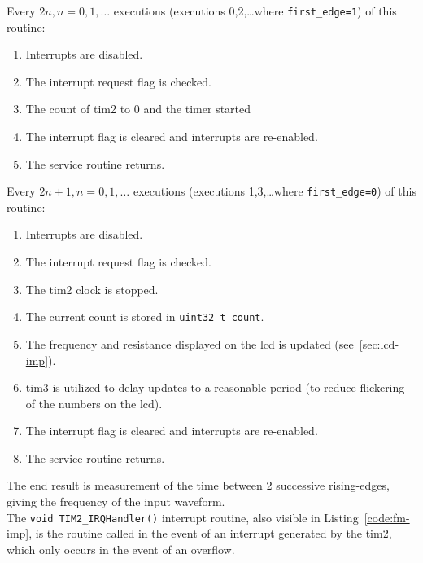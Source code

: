 
Every $2n,
n=0,1,\dots$  executions (executions 0,2,\dots where
\lstinline{first_edge=1}) of this routine:

\begin{enumerate}
	\item Interrupts are disabled.
	\item The interrupt request flag is checked.
	\item The count of \gls{tim2} to 0 and the timer started
	\item The interrupt flag is cleared and interrupts are re-enabled.
	\item The service routine returns.
\end{enumerate}

Every $2n+1, n=0,1,\dots$ executions (executions 1,3,\dots where
\lstinline{first_edge=0}) of this routine:

\begin{enumerate}
	\item Interrupts are disabled.
	\item The interrupt request flag is checked.
	\item The \gls{tim2} clock is stopped.
	\item The current count is stored in \lstinline{uint32_t count}.
	\item The frequency and resistance displayed on the \gls{lcd} is
		updated (see~\ref{sec:lcd-imp}).
	\item \gls{tim3} is utilized to delay updates to a reasonable period
		(to reduce flickering of the numbers on the \gls{lcd}).
	\item The interrupt flag is cleared and interrupts are re-enabled.
	\item The service routine returns.
\end{enumerate}

The end result is measurement of the time between 2 successive
rising-edges, giving the frequency of the input waveform. \\ 

The \lstinline{void TIM2_IRQHandler()} interrupt routine, also visible in
Listing~\ref{code:fm-imp}, is the routine called in the event of an
interrupt generated by the \gls{tim2}, which only occurs in the event of
an overflow.


